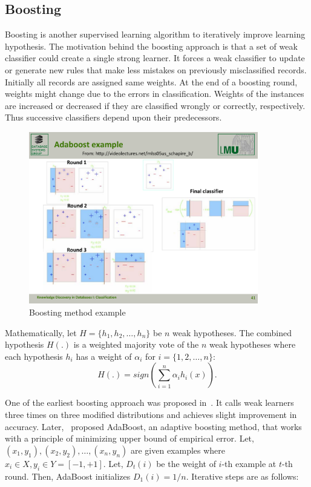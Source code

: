 \subsection{Boosting}
Boosting is another supervised learning algorithm to iteratively improve learning hypothesis. The motivation behind the boosting approach is that a set of weak classifier could create a single strong learner. It forces a weak classifier to update or generate new rules that make less mistakes on previously misclassified records. Initially all records are assigned same weights. At the end of a boosting round, weights might change due to the errors in classification. Weights of the instances are increased or decreased if they are classified wrongly or correctly, respectively. Thus successive classifiers depend upon their predecessors. 
\begin{figure}[htbp]
    \begin{center}
        \includegraphics[width=10.0cm]{figs/boosting.pdf}
        \caption{Boosting method example}
        \label{fig:bg:bagging}
    \end{center}
\end{figure}

Mathematically, let $H= \{h_1, h_2, \dots, h_n\}$ be $n$ weak hypotheses. The combined hypothesis $H(.)$ is a weighted majority vote of the $n$ weak hypotheses where each hypothesis $h_i$ has a weight of $\alpha_i$ for $i = \{1, 2, \dots, n\}$:
\begin{equation}
\label{eqn:adaboostHypo}
    H(.) = sign \left(\sum_{i=1}^n \alpha_i h_i(x) \right).
\end{equation}

One of the earliest boosting approach was proposed in~\cite{schapire90:whyens}. It calls weak learners three times on three modified distributions and achieves slight improvement in accuracy. Later,~\cite{freund97:boosting} proposed AdaBoost, an adaptive boosting method, that works with a principle of minimizing upper bound of empirical error. Let, $(x_1, y_1), (x_2, y_2), \dots, (x_n, y_n)$ are given examples where $x_i \in X, y_i \in Y = [-1, +1]$. Let, $D_t (i)$ be the weight of $i$-th example at $t$-th round. Then, AdaBoost initializes $D_1(i) =1/n$. Iterative steps are as follows:

